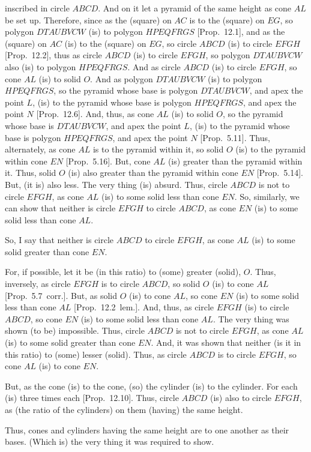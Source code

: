 \begin{Parallel}{}{}
{inscribed in circle $ABCD$. And on it let a pyramid of the same height as cone 
$AL$ be set up.
Therefore, since as the (square) on $AC$ is to the (square) on $EG$, so polygon $DTAUBVCW$ (is) to
polygon $HPEQFRGS$ [Prop.~12.1], and as the (square) on $AC$ (is) to the (square) on $EG$,
so circle $ABCD$ (is) to circle $EFGH$ [Prop.~12.2], thus as circle $ABCD$ (is) to
circle $EFGH$, so polygon $DTAUBVCW$ also (is) to polygon $HPEQFRGS$. And as circle $ABCD$ (is) to circle
$EFGH$, so cone $AL$ (is) to solid $O$. And as polygon $DTAUBVCW$ (is) to polygon $HPEQFRGS$, so the
pyramid whose base is polygon $DTAUBVCW$, and apex the point $L$, (is) to  the pyramid whose base is
polygon $HPEQFRGS$, and apex the point $N$ [Prop.~12.6]. And, thus, as cone $AL$ (is)
to solid $O$, so the pyramid whose base is $DTAUBVCW$, and apex the point $L$, (is) to  the pyramid whose base is
polygon $HPEQFRGS$, and apex the point $N$ [Prop.~5.11]. Thus, alternately, as cone $AL$ is to the pyramid within it, so solid $O$
(is) to the pyramid within cone $EN$ [Prop.~5.16]. But, cone $AL$ (is) greater than the
pyramid within it. Thus, solid $O$ (is) also greater than the pyramid within cone $EN$ [Prop.~5.14]. But,
(it is) also less. The very thing (is) absurd. Thus, circle $ABCD$ is not to circle $EFGH$, as cone $AL$
(is) to some solid less than cone $EN$. So, similarly, we can show that neither is circle $EFGH$
to circle $ABCD$, as cone $EN$ (is) to some solid less than cone $AL$.

So, I say that neither is circle $ABCD$ to circle $EFGH$, as cone $AL$ (is) to some solid greater than
cone $EN$.

For, if possible, let it be (in this ratio) to (some) greater (solid), $O$. Thus, inversely, as circle $EFGH$ is to circle
$ABCD$, so solid $O$ (is) to cone $AL$ [Prop.~5.7~corr.]. But, as solid $O$ (is) to cone $AL$, so cone $EN$ (is) to some
solid less than cone $AL$ [Prop.~12.2~lem.].  And, thus, as circle $EFGH$
(is)  to circle $ABCD$, so cone $EN$ (is) to some solid less than cone $AL$. The very thing was shown
(to be) impossible. Thus, circle $ABCD$ is not to circle $EFGH$, as cone $AL$ (is) to some solid greater than
cone $EN$. And, it was shown that neither (is it in this ratio) to (some) lesser (solid). Thus, as circle $ABCD$ is to circle
$EFGH$, so cone $AL$ (is) to cone $EN$.

But, as the cone (is) to the cone, (so) the cylinder (is) to the cylinder. For each (is) three times each [Prop.~12.10]. Thus, circle $ABCD$ (is) also to circle $EFGH$, as  (the ratio of the cylinders) on them (having) the
same height.

Thus, cones and cylinders having the same height are to one another as their bases. (Which is) the very thing
it was required to show.}
\end{Parallel}

